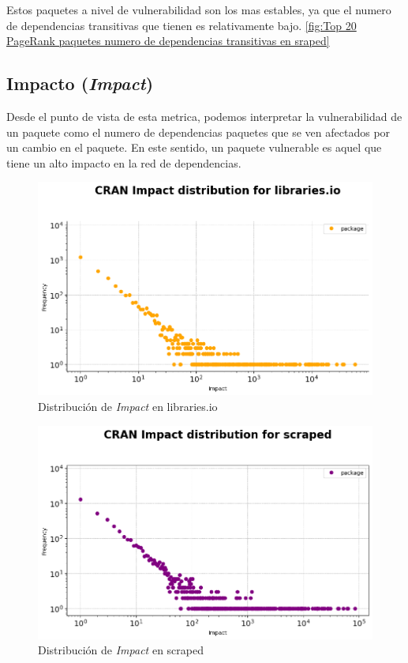 Estos paquetes a nivel de vulnerabilidad son los mas estables, ya que el numero de dependencias
transitivas que tienen es relativamente bajo. \ref{fig:Top 20 PageRank paquetes numero de dependencias transitivas en sraped}

\subsection{Impacto (\textit{Impact})}

Desde el punto de vista de esta metrica, podemos interpretar la vulnerabilidad de un paquete como el numero
de dependencias paquetes que se ven afectados por un cambio en el paquete. En este sentido, un paquete
vulnerable es aquel que tiene un alto impacto en la red de dependencias.

\begin{figure}[h!]
    \begin{center}
        \includegraphics[width=1\textwidth]{img/cran/impact_dist_libio.png}
        \caption{Distribución de \textit{Impact} en libraries.io}
        \label{fig:Distribución de Impact en libraries.io}
    \end{center}
\end{figure}

\begin{figure}[h!]
    \begin{center}
        \includegraphics[width=1\textwidth]{img/cran/impact_dist_scraped.png}
        \caption{Distribución de \textit{Impact} en scraped}
        \label{fig:Distribución de Impact en scraped}
    \end{center}
\end{figure}

